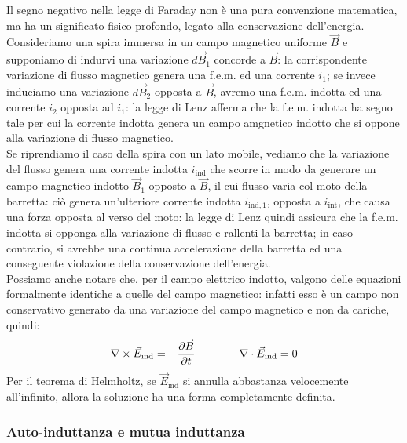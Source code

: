 Il segno negativo nella legge di Faraday non è una pura convenzione matematica, ma ha un significato fisico profondo, legato alla conservazione dell'energia. \\ 
%
Consideriamo una spira immersa in un campo magnetico uniforme $ \vec{B} $ e supponiamo di indurvi una variazione $ d\vec{B}_1 $ concorde a $ \vec{B} $: la corrispondente variazione di flusso magnetico genera una f.e.m. ed una corrente $ i_1 $; se invece induciamo una variazione $ d\vec{B}_2 $ opposta a $ \vec{B} $, avremo una f.e.m. indotta ed una corrente $ i_2 $ opposta ad $ i_1 $: la legge di Lenz afferma che la f.e.m. indotta ha segno tale per cui la corrente indotta genera un campo amgnetico indotto che si oppone alla variazione di flusso magnetico. \\ 
%
Se riprendiamo il caso della spira con un lato mobile, vediamo che la variazione del flusso genera una corrente indotta $ i_{\text{ind}} $ che scorre in modo da generare un campo magnetico indotto $ \vec{B}_1 $ opposto a $ \vec{B} $, il cui flusso varia col moto della barretta: ciò genera un'ulteriore corrente indotta $ i_{\text{ind},1} $, opposta a $ i_{\text{int}} $, che causa una forza opposta al verso del moto: la legge di Lenz quindi assicura che la f.e.m. indotta si opponga alla variazione di flusso e rallenti la barretta; in caso contrario, si avrebbe una continua accelerazione della barretta ed una conseguente violazione della conservazione dell'energia. \\ 
%
Possiamo anche notare che, per il campo elettrico indotto, valgono delle equazioni formalmente identiche a quelle del campo magnetico: infatti esso è un campo non conservativo generato da una variazione del campo magnetico e non da cariche, quindi:
\begin{equation}
	\nabla\times\vec{E}_{\text{ind}} = -\frac{\partial\vec{B}}{\partial t} \qquad\qquad \nabla\cdot\vec{E}_{\text{ind}} = 0
	\label{eq:16}
\end{equation}
Per il teorema di Helmholtz, se $ \vec{E}_{\text{ind}} $ si annulla abbastanza velocemente all'infinito, allora la soluzione ha una forma completamente definita.

\subsubsection{Auto-induttanza e mutua induttanza}

